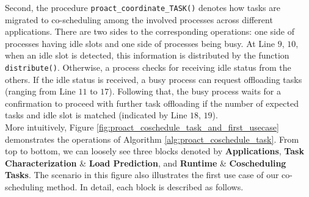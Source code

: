 Second, the procedure \texttt{proact\_coordinate\_TASK()} denotes how tasks are migrated to co-scheduling among the involved processes across different applications. There are two sides to the corresponding operations: one side of processes having idle slots and one side of processes being busy. At Line $9$, $10$, when an idle slot is detected, this information is distributed by the function \texttt{distribute()}. Otherwise, a process checks for receiving idle status from the others. If the idle status is received, a busy process can request offloading tasks (ranging from Line $11$ to $17$). Following that, the busy process waits for a confirmation to proceed with further task offloading if the number of expected tasks and idle slot is matched (indicated by Line $18$, $19$).\\

More intuitively, Figure \ref{fig:proact_coschedule_task_and_first_usecase} demonstrates the operations of Algorithm \ref{alg:proact_coschedule_task}. From top to bottom, we can loosely see three blocks denoted by \textbf{Applications}, \textbf{Task Characterization} \& \textbf{Load Prediction}, and \textbf{Runtime} \& \textbf{Coscheduling Tasks}. The scenario in this figure also illustrates the first use case of our co-scheduling method. In detail, each block is described as follows.

